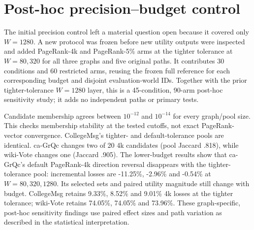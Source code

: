 \documentclass[smallextended]{svjour3}
\begin{document}
\section{Post-hoc precision--budget control}
The initial precision control left a material question open because it covered
only $W=1280$. A new protocol was frozen before new utility outputs were inspected
and added PageRank-4k and PageRank-5\% arms at the tighter tolerance at $W=80,320$ for all three
graphs and five original paths. It contributes 30 conditions and 60 restricted
arms, reusing the frozen full reference for each corresponding budget and disjoint evaluation-world IDs. Together
with the prior tighter-tolerance $W=1280$ layer, this is a 45-condition, 90-arm post-hoc
sensitivity study; it adds no independent paths or primary tests.

Candidate membership agrees between $10^{-12}$ and $10^{-14}$ for every graph/pool size. This checks membership stability at the tested cutoffs, not exact PageRank-vector convergence.
CollegeMsg's tighter- and default-tolerance pools are identical. ca-GrQc changes two of 20
4k candidates (pool Jaccard .818), while wiki-Vote changes one (Jaccard .905).
The lower-budget results show that ca-GrQc's default PageRank-4k direction reversal
disappears with the tighter-tolerance pool: incremental losses are -11.25\%, -2.96\% and
-0.54\% at $W=80,320,1280$. Its selected sets and paired utility magnitude still
change with budget. CollegeMsg retains 9.33\%, 8.52\% and 9.01\% 4k losses at the tighter tolerance;
wiki-Vote retains 74.05\%, 74.05\% and 73.96\%. These graph-specific, post-hoc sensitivity findings use paired effect sizes and path variation as described in the statistical interpretation.

\end{document}
